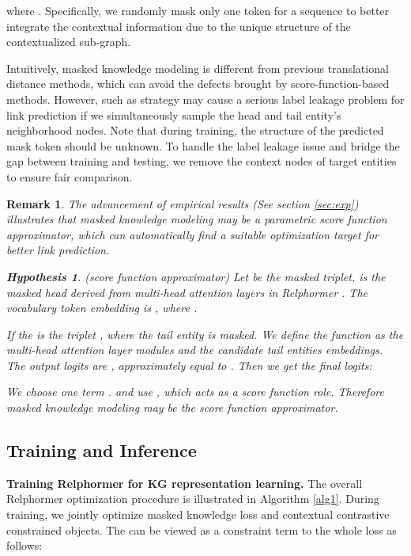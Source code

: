 \documentclass[sigconf]{acmart}
\newtheorem{remark}{\noindent \textbf{Remark}}
\newtheorem{proof_}{\noindent \textbf{Hypothesis}}
\newcommand{\bizhen}[1]{{\color{black}#1}}
\begin{document}
where .
Specifically, we randomly mask only one token for a sequence to better integrate the contextual information due to the unique structure of the contextualized sub-graph.

Intuitively, masked knowledge modeling is different from previous translational distance methods, which can avoid the defects brought by score-function-based methods.
However, such as strategy may cause a serious label leakage problem for link prediction if we simultaneously sample the head and tail entity's neighborhood nodes.
Note that during training, the structure of the predicted mask token should be unknown.
To handle the label leakage issue and bridge the gap between training and testing, we {remove the context nodes of target entities to ensure fair comparison}.

\begin{remark}
The advancement of empirical results (See section \ref{sec:exp}) illustrates that masked knowledge modeling may be a parametric score function approximator, which can automatically find a suitable optimization target for better link prediction.


\begin{proof_}
(score function approximator) Let  be the masked triplet,  is the masked head derived from multi-head attention layers in Relphormer . 
The vocabulary token embedding is , where . 

If the  is the triplet , where the tail entity is masked.
We define the  function as the multi-head attention layer modules and  the candidate tail entities embeddings. The output logits are , approximately equal to .
Then we get the final logits:



We choose one term . 
and use , which acts as a score function role.
Therefore masked knowledge modeling may be the score function approximator.
\end{proof_}
\end{remark}

\subsection{Training and Inference}
\label{sec:downtream_task}
\textbf{Training Relphormer for KG representation learning.}
The overall Relphormer optimization procedure is illustrated in \bizhen{Algorithm \ref{alg1}}.
During training, we jointly optimize masked knowledge loss and contextual contrastive constrained objects. 
The  can be viewed as a constraint term to the whole loss  as follows:
\end{document}
